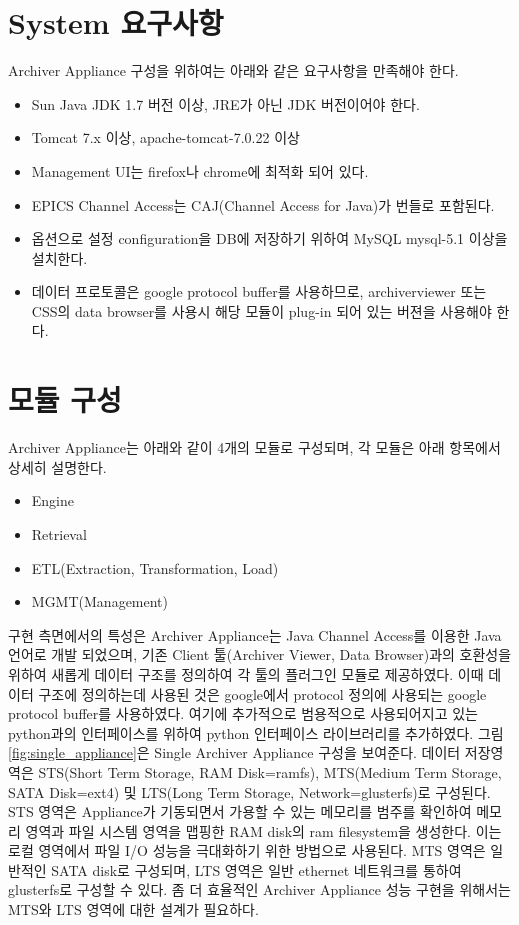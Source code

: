 \documentclass[11pt
  , a4paper
  , article
  , oneside
]{memoir}
\begin{document}
\section{System 요구사항}
Archiver Appliance 구성을 위하여는 아래와 같은 요구사항을 만족해야 한다.
\begin{itemize}
	\item Sun Java JDK 1.7 버전 이상, JRE가 아닌 JDK 버전이어야 한다.
	\item Tomcat 7.x 이상\cite{apachetomcat}, apache-tomcat-7.0.22 이상
	\item Management UI는 firefox나 chrome에 최적화 되어 있다.
	\item EPICS Channel Access는 CAJ(Channel Access for Java)가 번들로 포함된다.
	\item 옵션으로 설정 configuration을 DB에 저장하기 위하여 MySQL mysql-5.1 이상을 설치한다.
	\item 데이터 프로토콜은 google protocol buffer\cite{protobuffer}를 사용하므로, archiverviewer 또는 CSS의 data browser를 사용시 해당 모듈이 plug-in 되어 있는 버젼을 사용해야 한다.
\end{itemize}

\section{모듈 구성}
Archiver Appliance는 아래와 같이 4개의 모듈로 구성되며, 각 모듈은 아래 항목에서 상세히 설명한다.

\begin{itemize}
	\item Engine
	\item Retrieval
	\item ETL(Extraction, Transformation, Load)
	\item MGMT(Management)
\end{itemize}
구현 측면에서의 특성은 Archiver Appliance는 Java Channel Access를 이용한 Java 언어로 개발 되었으며, 기존 Client 툴(Archiver Viewer, Data Browser)과의 호환성을 위하여 새롭게 데이터 구조를 정의하여 각 툴의 플러그인 모듈로 제공하였다. 이때 데이터 구조에 정의하는데 사용된 것은 google에서 protocol 정의에 사용되는 google protocol buffer를 사용하였다. 여기에 추가적으로 범용적으로 사용되어지고 있는 python과의 인터페이스를 위하여 python 인터페이스 라이브러리를 추가하였다. 그림 \ref{fig:single_appliance}은 Single Archiver Appliance 구성을 보여준다. 데이터 저장영역은 STS(Short Term Storage, RAM Disk=ramfs), MTS(Medium Term Storage, SATA Disk=ext4) 및 LTS(Long Term Storage, Network=glusterfs)로 구성된다. STS 영역은 Appliance가 기동되면서 가용할 수 있는 메모리를 범주를 확인하여 메모리 영역과 파일 시스템 영역을 맵핑한 RAM disk의 ram filesystem을 생성한다. 이는 로컬 영역에서 파일 I/O 성능을 극대화하기 위한 방법으로 사용된다. MTS 영역은 일반적인 SATA disk로 구성되며, LTS 영역은 일반 ethernet 네트워크를 통하여 glusterfs로 구성할 수 있다. 좀 더 효율적인 Archiver Appliance 성능 구현을 위해서는 MTS와 LTS 영역에 대한 설계가 필요하다.
 
\end{document}
